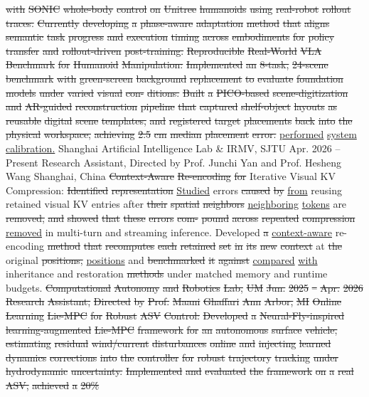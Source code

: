 \documentclass[10pt,letterpaper]{article}
\newcommand{\del}[1]{{\color{red}\sout{#1}}}
\newcommand{\add}[1]{{\color{blue}\uline{#1}}}
\begin{document}
\del{with} \del{SONIC} \del{whole-body} \del{control} \del{on} \del{Unitree} \del{humanoids} \del{using} \del{real-robot} \del{rollout} \del{traces.} \del{Currently} \del{developing} \del{a} \del{phase-aware} \del{adaptation} \del{method} \del{that} \del{aligns} \del{semantic} \del{task} \del{progress} \del{and} \del{execution} \del{timing} \del{across} \del{embodiments} \del{for} \del{policy} \del{transfer} \del{and} \del{rollout-driven} \del{post-training.} \del{} \del{Reproducible} \del{Real-World} \del{VLA} \del{Benchmark} \del{for} \del{Humanoid} \del{Manipulation:} \del{Implemented} \del{an} \del{8-task,} \del{24-scene} \del{benchmark} \del{with} \del{green-screen} \del{background} \del{replacement} \del{to} \del{evaluate} \del{foundation} \del{models} \del{under} \del{varied} \del{visual} \del{con-} \del{ditions.} \del{Built} \del{a} \del{PICO-based} \del{scene-digitization} \del{and} \del{AR-guided} \del{reconstruction} \del{pipeline} \del{that} \del{captured} \del{shelf-object} \del{layouts} \del{as} \del{reusable} \del{digital} \del{scene} \del{templates,} \del{and} \del{registered} \del{target} \del{placements} \del{back} \del{into} \del{the} \del{physical} \del{workspace,} \del{achieving} \del{2.5} \del{cm} \del{median} \del{placement} \del{error.} \add{performed} \add{system} \add{calibration.} Shanghai Artificial Intelligence Lab \& IRMV, SJTU Apr. 2026 -- Present Research Assistant, Directed by Prof. Junchi Yan and Prof. Hesheng Wang Shanghai, China  \del{Context-Aware} \del{Re-encoding} \del{for} Iterative Visual KV Compression: \del{Identified} \del{representation} \add{Studied} errors \del{caused} \del{by} \add{from} reusing retained visual KV entries after \del{their} \del{spatial} \del{neighbors} \add{neighboring} \add{tokens} are \del{removed,} \del{and} \del{showed} \del{that} \del{these} \del{errors} \del{com-} \del{pound} \del{across} \del{repeated} \del{compression} \add{removed} in multi-turn and streaming inference. Developed \del{a} \add{context-aware} re-encoding \del{method} \del{that} \del{recomputes} \del{each} \del{retained} \del{set} \del{in} \del{its} \del{new} \del{context} at \del{the} original \del{positions,} \add{positions} and \del{benchmarked} \del{it} \del{against} \add{compared} \add{with} inheritance and restoration \del{methods} under matched memory and runtime budgets. \del{Computational} \del{Autonomy} \del{and} \del{Robotics} \del{Lab,} \del{UM} \del{Jun.} \del{2025} \del{--} \del{Apr.} \del{2026} \del{Research} \del{Assistant,} \del{Directed} \del{by} \del{Prof.} \del{Maani} \del{Ghaffari} \del{Ann} \del{Arbor,} \del{MI} \del{} \del{Online} \del{Learning} \del{Lie-MPC} \del{for} \del{Robust} \del{ASV} \del{Control:} \del{Developed} \del{a} \del{Neural-Fly-inspired} \del{learning-augmented} \del{Lie-MPC} \del{framework} \del{for} \del{an} \del{autonomous} \del{surface} \del{vehicle,} \del{estimating} \del{residual} \del{wind/current} \del{disturbances} \del{online} \del{and} \del{injecting} \del{learned} \del{dynamics} \del{corrections} \del{into} \del{the} \del{controller} \del{for} \del{robust} \del{trajectory} \del{tracking} \del{under} \del{hydrodynamic} \del{uncertainty.} \del{Implemented} \del{and} \del{evaluated} \del{the} \del{framework} \del{on} \del{a} \del{real} \del{ASV,} \del{achieved} \del{a} \del{20\%} 
\end{document}
